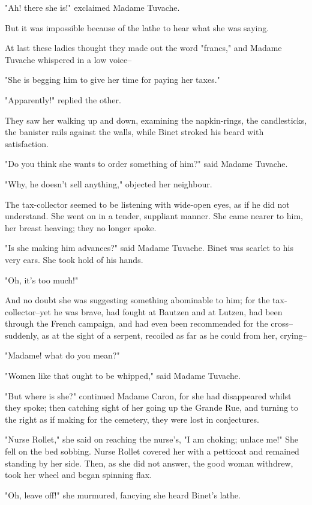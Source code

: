 \documentclass[11pt,twocolumn]{ltugboat}
\begin{document}
"Ah! there she is!" exclaimed Madame Tuvache.

But it was impossible because of the lathe to hear what she was saying.

At last these ladies thought they made out the word "francs," and Madame
Tuvache whispered in a low voice--

"She is begging him to give her time for paying her taxes."

"Apparently!" replied the other.

They saw her walking up and down, examining the napkin-rings, the
candlesticks, the banister rails against the walls, while Binet stroked
his beard with satisfaction.

"Do you think she wants to order something of him?" said Madame Tuvache.

"Why, he doesn't sell anything," objected her neighbour.

The tax-collector seemed to be listening with wide-open eyes, as if he
did not understand. She went on in a tender, suppliant manner. She came
nearer to him, her breast heaving; they no longer spoke.

"Is she making him advances?" said Madame Tuvache. Binet was scarlet to
his very ears. She took hold of his hands.

"Oh, it's too much!"

And no doubt she was suggesting something abominable to him; for the
tax-collector--yet he was brave, had fought at Bautzen and at Lutzen,
had been through the French campaign, and had even been recommended for
the cross--suddenly, as at the sight of a serpent, recoiled as far as he
could from her, crying--

"Madame! what do you mean?"

"Women like that ought to be whipped," said Madame Tuvache.

"But where is she?" continued Madame Caron, for she had disappeared
whilst they spoke; then catching sight of her going up the Grande Rue,
and turning to the right as if making for the cemetery, they were lost
in conjectures.

"Nurse Rollet," she said on reaching the nurse's, "I am choking; unlace
me!" She fell on the bed sobbing. Nurse Rollet covered her with a
petticoat and remained standing by her side. Then, as she did not
answer, the good woman withdrew, took her wheel and began spinning flax.

"Oh, leave off!" she murmured, fancying she heard Binet's lathe.
\end{document}
